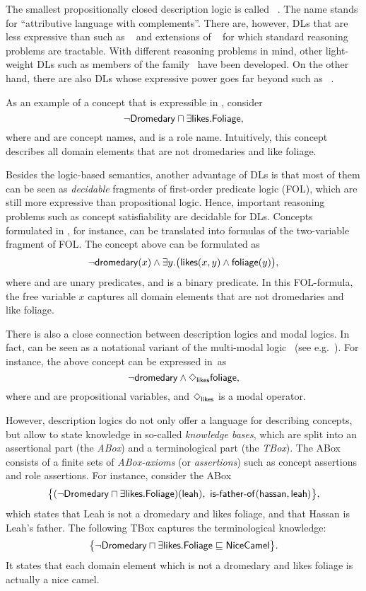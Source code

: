The smallest propositionally closed description logic is called
\ALC~\cite{ScSm-AIJ91}.  The name \ALC stands for \enquote{attributive language
with complements}.  There are, however, DLs that are less expressive than \ALC
such as \EL~\cite{Baa-IJCAI03,Bra-ECAI04} and extensions of
\EL~\cite{BaBL-IJCAI05,BaBL-OWLEDDC08} for which standard reasoning problems are
tractable.  With different reasoning problems in mind, other light-weight DLs
such as members of the \DLLite family~\cite{CDL+-AAAI05,ACK+-JAIR09,CDL+-RW09}
have been developed.  On the other hand, there are also DLs whose expressive
power goes far beyond \ALC such as \SROIQ~\cite{HoKS-KR06}.

As an example of a concept that is expressible in \ALC, consider
\[\lnot\mathsf{Dromedary}\sqcap\exists\mathsf{likes}.\mathsf{Foliage},\]
where \Dromedary and \Foliage are concept names, and \likes is a role name.
Intuitively, this concept describes all domain elements that are not dromedaries
and like foliage.

Besides the logic-based semantics, another advantage of DLs is that most of them
can be seen as \emph{decidable} fragments of first-order predicate logic (FOL),
which are still more expressive than propositional logic.  Hence, important
reasoning problems such as concept satisfiability are decidable for DLs.
Concepts formulated in \ALC, for instance, can be translated into formulas of
the two-variable fragment of FOL\@.  The concept above can be formulated as
\[\lnot\mathsf{dromedary}(x)\land\exists y.\bigl(\mathsf{likes}(x,y)\land\mathsf{foliage}(y)\bigr),\]
where \dromedary and \foliage are unary predicates, and \likes is a binary
predicate.  In this FOL-formula, the free variable $x$ captures all domain
elements that are not dromedaries and like foliage.

There is also a close connection between description logics and modal logics.
In fact, \ALC can be seen as a notational variant of the multi-modal logic~\Kn
(see e.g.~\cite{GKW+-03,MLhandbook-07}).  For instance, the above concept can
be expressed in~\Kn as
\[\lnot\mathsf{dromedary}\land\Diamond_\mathsf{likes}\mathsf{foliage},\]
where \dromedary and \foliage are propositional variables, and $\Diamond_\mathsf{likes}$
is a modal operator.

However, description logics do not only offer a language for describing
concepts, but allow to state knowledge in so-called \emph{knowledge bases},
which are split into an assertional part (the \emph{ABox}) and a terminological
part (the \emph{TBox}).  The ABox consists of a finite sets of
\emph{ABox-axioms} (or \emph{assertions}) such as concept assertions and role
assertions.  For instance, consider the ABox
\[\bigl\{(\lnot\mathsf{Dromedary}\sqcap\exists\mathsf{likes}.\mathsf{Foliage})(\mathsf{leah}),\
    \mathsf{is\text{-}father\text{-}of}(\mathsf{hassan},\mathsf{leah})\bigr\},\]
which states that Leah is not a dromedary and likes foliage, and that Hassan is
Leah's father.
%
The following TBox captures the terminological knowledge:
\[\bigl\{\lnot\mathsf{Dromedary}\sqcap\exists\mathsf{likes}.\mathsf{Foliage}\sqsubseteq\mathsf{NiceCamel}\bigr\}.\]
It states that each domain element which is not a dromedary and likes foliage is
actually a nice camel.

